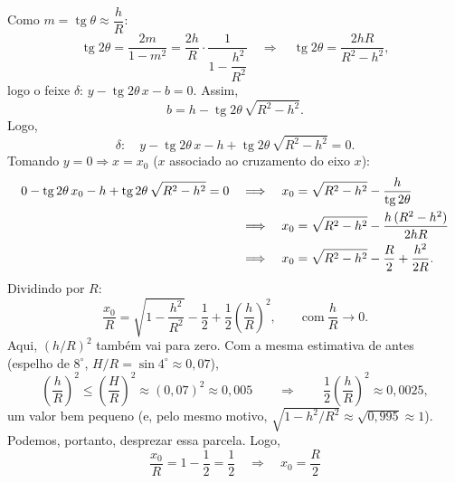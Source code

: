 \documentclass[11pt,a4paper]{article}
\DeclareMathOperator{\tg}{tg}
\begin{document}
Como $m = \tg\theta \approx \dfrac{h}{R}$:
\begin{equation}\label{eq:tg2}
  \tg 2\theta = \frac{2m}{1 - m^2} = \frac{2h}{R}\cdot\frac{1}{1 - \dfrac{h^2}{R^2}}
  \quad\Longrightarrow\quad \tg 2\theta = \frac{2hR}{R^2 - h^2},
\end{equation}
logo o feixe $\delta$: $y - \tg 2\theta\, x - b = 0$. Assim,
\begin{equation}\label{eq:b}
  b = h - \tg 2\theta\,\sqrt{R^2 - h^2}.
\end{equation}
Logo,
\begin{equation}\label{eq:delta}
  \delta:\quad y - \tg 2\theta\, x - h + \tg 2\theta\,\sqrt{R^2 - h^2} = 0.
\end{equation}
Tomando $y = 0 \Rightarrow x = x_0$ ($x$ associado ao cruzamento do eixo $x$):
\begin{align}
  0 - \tg 2\theta\, x_0 - h + \tg 2\theta\,\sqrt{R^2 - h^2} = 0
  \quad&\Longrightarrow\quad x_0 = \sqrt{R^2 - h^2} - \frac{h}{\tg 2\theta}
  \label{eq:x0}\\
  &\Longrightarrow\quad x_0 = \sqrt{R^2 - h^2} - \frac{h\,(R^2 - h^2)}{2hR}
  \label{eq:x0b}\\
  &\Longrightarrow\quad x_0 = \sqrt{R^2 - h^2} - \frac{R}{2} + \frac{h^2}{2R}.
  \notag
\end{align}
Dividindo por $R$:
\begin{equation}\label{eq:x0R}
  \frac{x_0}{R} = \sqrt{1 - \frac{h^2}{R^2}} - \frac{1}{2}
  + \frac{1}{2}\left(\frac{h}{R}\right)^{2}, \qquad \text{com}\ \frac{h}{R} \to 0.
\end{equation}
Aqui, $(h/R)^2$ também vai para zero. Com a mesma estimativa de antes (espelho
de $8^\circ$, $H/R = \sin 4^\circ \approx 0{,}07$),
\[
  \left(\frac{h}{R}\right)^2 \le \left(\frac{H}{R}\right)^2 \approx (0{,}07)^2
  \approx 0{,}005
  \qquad\Longrightarrow\qquad
  \frac{1}{2}\left(\frac{h}{R}\right)^2 \approx 0{,}0025,
\]
um valor bem pequeno (e, pelo mesmo motivo, $\sqrt{1 - h^2/R^2} \approx
\sqrt{0{,}995} \approx 1$). Podemos, portanto, desprezar essa parcela.
Logo,
\begin{equation}\label{eq:foco}
  \frac{x_0}{R} = 1 - \frac{1}{2} = \frac{1}{2}
  \quad\Longrightarrow\quad \boxed{x_0 = \frac{R}{2}}
\end{equation}
\end{document}
